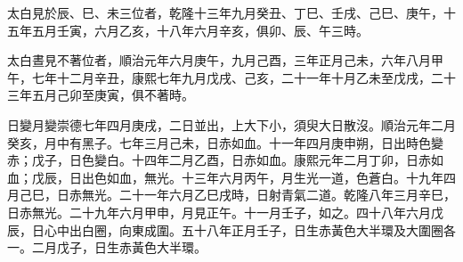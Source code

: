 \begin{pinyinscope}
太白見於辰、巳、未三位者，乾隆十三年九月癸丑、丁巳、壬戌、己巳、庚午，十五年五月壬寅，六月乙亥，十八年六月辛亥，俱卯、辰、午三時。

太白晝見不著位者，順治元年六月庚午，九月己酉，三年正月己未，六年八月甲午，七年十二月辛丑，康熙七年九月戊戌、己亥，二十一年十月乙未至戊戌，二十三年五月己卯至庚寅，俱不著時。

日變月變崇德七年四月庚戌，二日並出，上大下小，須臾大日散沒。順治元年二月癸亥，月中有黑子。七年三月己未，日赤如血。十一年四月庚申朔，日出時色變赤；戊子，日色變白。十四年二月乙酉，日赤如血。康熙元年二月丁卯，日赤如血；戊辰，日出色如血，無光。十三年六月丙午，月生光一道，色蒼白。十九年四月己巳，日赤無光。二十一年六月乙巳戌時，日射青氣二道。乾隆八年三月辛巳，日赤無光。二十九年六月甲申，月見正午。十一月壬子，如之。四十八年六月戊辰，日心中出白圈，向東成圍。五十八年正月壬子，日生赤黃色大半環及大圍圈各一。二月戊子，日生赤黃色大半環。


\end{pinyinscope}